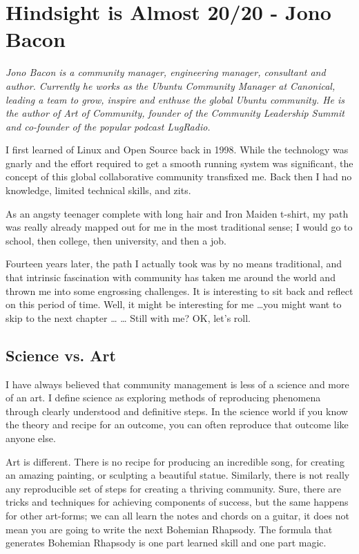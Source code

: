 \chapter{Hindsight is Almost 20/20 - Jono Bacon}

\textit{Jono Bacon is a community manager, engineering manager, consultant and author.
Currently he works as the Ubuntu Community Manager at Canonical, leading a team
to grow, inspire and enthuse the global Ubuntu community. He is the author of
Art of Community, founder of the Community Leadership Summit and co-founder of
the popular podcast LugRadio.}

I first learned of Linux and Open Source back in 1998. While the technology was
gnarly and the effort required to get a smooth running system was significant,
the concept of this global collaborative community transfixed me. Back then I
had no knowledge, limited technical skills, and zits.

As an angsty teenager complete with long hair and Iron Maiden t-shirt, my path
was really already mapped out for me in the most traditional sense; I would go
to school, then college, then university, and then a job.

Fourteen years later, the path I actually took was by no means traditional, and
that intrinsic fascination with community has taken me around the world and
thrown me into some engrossing challenges. It is interesting to sit back and
reflect on this period of time. Well, it might be interesting for me \dots you
might want to skip to the next chapter \dots 
\newline
\dots
\newline
Still with me? OK, let’s roll.

\section*{Science vs. Art}

I have always believed that community management is less of a science and more
of an art. I define science as exploring methods of reproducing phenomena
through clearly understood and definitive steps. In the science world if you
know the theory and recipe for an outcome, you can often reproduce that outcome
like anyone else.

Art is different. There is no recipe for producing an incredible song, for
creating an amazing painting, or sculpting a beautiful statue. Similarly, there
is not really any reproducible set of steps for creating a thriving community.
Sure, there are tricks and techniques for achieving components of success, but
the same happens for other art-forms; we can all learn the notes and chords on a
guitar, it does not mean you are going to write the next Bohemian Rhapsody. The
formula that generates Bohemian Rhapsody is one part learned skill and one part
magic.


